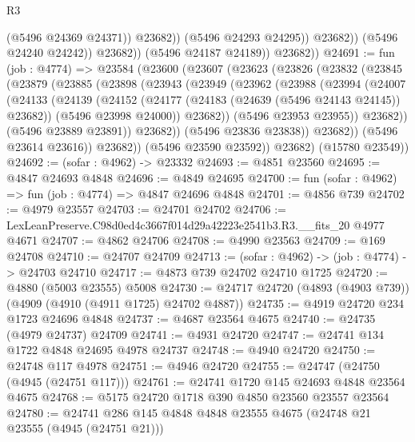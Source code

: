 \begin{lexlean}{R3}
\begin{coremodule}
                            (@5496 @24369 @24371))
                          @23682))
                      (@5496 @24293 @24295))
                    @23682))
                (@5496 @24240 @24242))
              @23682))
          (@5496 @24187 @24189))
        @23682))
@24691 := fun (job : @4774) =>
  @23584
    (@23600
      (@23607
        (@23623
          (@23826
            (@23832
              (@23845
                (@23879
                  (@23885
                    (@23898
                      (@23943
                        (@23949
                          (@23962
                            (@23988
                              (@23994
                                (@24007
                                  (@24133
                                    (@24139
                                      (@24152
                                        (@24177 (@24183 (@24639 (@5496 @24143 @24145)) @23682))
                                        (@5496 @23998 @24000))
                                      @23682))
                                  (@5496 @23953 @23955))
                                @23682))
                            (@5496 @23889 @23891))
                          @23682))
                      (@5496 @23836 @23838))
                    @23682))
                (@5496 @23614 @23616))
              @23682))
          (@5496 @23590 @23592))
        @23682)
      (@15780 @23549))
@24692 := (sofar : @4962) -> @23332
@24693 := @4851 @23560
@24695 := @4847 @24693 @4848
@24696 := @4849 @24695
@24700 := fun (sofar : @4962) => fun (job : @4774) => @4847 @24696 @4848
@24701 := @4856 @739
@24702 := @4979 @23557
@24703 := @24701 @24702
@24706 := LexLeanPreserve.C98d0ed4c3667f014d29a42223e2541b3.R3.__fits_20 @4977 @4671
@24707 := @4862 @24706
@24708 := @4990 @23563
@24709 := @169 @24708
@24710 := @24707 @24709
@24713 := (sofar : @4962) -> (job : @4774) -> @24703 @24710
@24717 := @4873 @739 @24702 @24710 @1725
@24720 := @4880 (@5003 @23555) @5008
@24730 := @24717 @24720 (@4893 (@4903 @739)) (@4909 (@4910 (@4911 @1725) @24702 @4887))
@24735 := @4919 @24720 @234 @1723 @24696 @4848
@24737 := @4687 @23564 @4675
@24740 := @24735 (@4979 @24737) @24709
@24741 := @4931 @24720
@24747 := @24741 @134 @1722 @4848 @24695 @4978 @24737
@24748 := @4940 @24720
@24750 := @24748 @117 @4978
@24751 := @4946 @24720
@24755 := @24747 (@24750 (@4945 (@24751 @117)))
@24761 := @24741 @1720 @145 @24693 @4848 @23564 @4675
@24768 := @5175 @24720 @1718 @390 @4850 @23560 @23557 @23564
@24780 := @24741 @286 @145 @4848 @4848 @23555 @4675 (@24748 @21 @23555 (@4945 (@24751 @21)))

\end{coremodule}
\end{lexlean}
